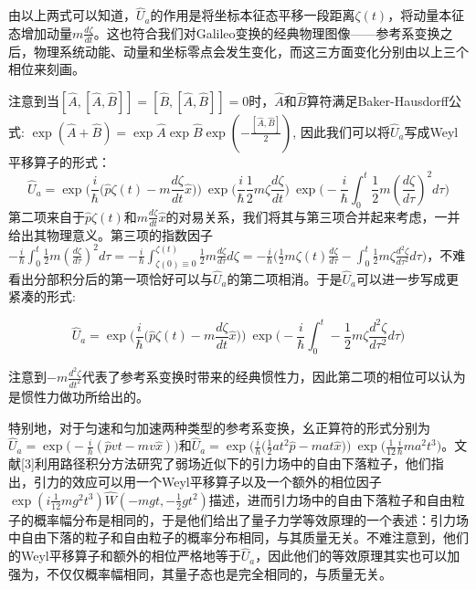 \documentclass[a4paper]{article}
\begin{document}
        由以上两式可以知道，$\hat{U}_a$的作用是将坐标本征态平移一段距离$\zeta(t)$，将动量本征态增加动量$m\frac{d \zeta}{dt}$。这也符合我们对Galileo变换的经典物理图像——参考系变换之后，物理系统动能、动量和坐标零点会发生变化，而这三方面变化分别由以上三个相位来刻画。

        注意到当$[\hat{A}, [\hat{A}, \hat{B}]]=[\hat{B}, [\hat{A}, \hat{B}]]=0$时，$\hat{A}$和$\hat{B}$算符满足Baker-Hausdorff公式: $\exp(\hat{A}+\hat{B})=\exp\hat{A} \exp\hat{B} \exp(-\frac{[\hat{A}, \hat{B}]}{2})$, 因此我们可以将$\hat{U}_a$写成Weyl平移算子的形式：
        \begin{equation}
            \hat{U}_a=\exp\bigg(\frac{i}{\hbar}\bigg(\hat{p}\zeta(t)-m\frac{d\zeta}{dt}\hat{x} \bigg) \bigg)\ \exp\bigg(\frac{i}{\hbar}\frac{1}{2}m\zeta\frac{d\zeta}{dt} \bigg)\ \exp\bigg(-\frac{i}{\hbar}\int_0^t\frac{1}{2}m(\frac{d \zeta}{d\tau})^2 d\tau \bigg)
        \end{equation}
        第二项来自于$\hat{p}\zeta(t)$和$m\frac{d\zeta}{dt}\hat{x}$的对易关系，我们将其与第三项合并起来考虑，一并给出其物理意义。第三项的指数因子$-\frac{i}{\hbar}\int_0^t\frac{1}{2}m(\frac{d \zeta}{d\tau})^2 d\tau = -\frac{i}{\hbar}\int_{\zeta(0)\equiv 0}^{\zeta(t)}\frac{1}{2}m\frac{d \zeta}{d\tau} d\zeta = -\frac{i}{\hbar}\bigg(\frac{1}{2}m\zeta(t)\frac{d \zeta}{d\tau}-\int_0^t\frac{1}{2}m\zeta\frac{d^2\zeta}{d\tau^2} d\tau\bigg)$，不难看出分部积分后的第一项恰好可以与$\hat{U}_a$的第二项相消。于是$\hat{U}_a$可以进一步写成更紧凑的形式:

        \begin{equation}
            \hat{U}_a = \exp\bigg(\frac{i}{\hbar}\bigg(\hat{p}\zeta(t)-m\frac{d\zeta}{dt}\hat{x} \bigg) \bigg)\ \exp\bigg( -\frac{i}{\hbar}\int_0^t-\frac{1}{2}m\zeta\frac{d^2\zeta}{d\tau^2} d\tau\bigg)
        \end{equation}

        注意到$-m\frac{d^2\zeta}{dt^2}$代表了参考系变换时带来的经典惯性力，因此第二项的相位可以认为是惯性力做功所给出的。
        
        特别地，对于匀速和匀加速两种类型的参考系变换，幺正算符的形式分别为$\hat{U}_a=\exp\big(-\frac{i}{h}(\hat{p}vt-mv\hat{x})\big)$和$\hat{U}_a=\exp\big(\frac{i}{\hbar}\big(\frac{1}{2}at^2\hat{p}-mat\hat{x} \big)\big)\ \exp\big(\frac{1}{12}\frac{i}{\hbar}ma^2t^3\big)$。文献[3]利用路径积分方法研究了弱场近似下的引力场中的自由下落粒子，他们指出，引力的效应可以用一个Weyl平移算子以及一个额外的相位因子$\exp(i\frac{1}{12}mg^2t^3)\hat{W}(-mgt,-\frac{1}{2}gt^2)$描述，进而引力场中的自由下落粒子和自由粒子的概率幅分布是相同的，于是他们给出了量子力学等效原理的一个表述：引力场中自由下落的粒子和自由粒子的概率分布相同，与其质量无关。不难注意到，他们的Weyl平移算子和额外的相位严格地等于$\hat{U}_a$，因此他们的等效原理其实也可以加强为，不仅仅概率幅相同，其量子态也是完全相同的，与质量无关。
\end{document}
